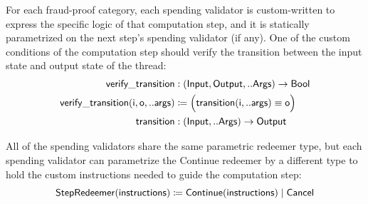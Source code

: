\documentclass[../midgard.tex]{subfiles}
\begin{document}
For each fraud-proof category, each spending validator is custom-written to express the specific logic of that computation step, and it is statically parametrized on the next step's spending validator (if any).
One of the custom conditions of the computation step should verify the transition between the input state and output state of the thread:
\begin{align*}
    \mathsf{verify\_transition} &: (\mathsf{Input}, \mathsf{Output}, ..\mathsf{Args}) -> \mathsf{Bool} \\
    \mathsf{verify\_transition(i, o, ..args)} &\coloneq
        \Bigl( \mathsf{transition(i, ..args) \equiv \mathsf{o}} \Bigr) \\
    \mathsf{transition} &: (\mathsf{Input}, ..\mathsf{Args}) -> \mathsf{Output}
\end{align*}

All of the spending validators share the same parametric redeemer type, but each spending validator can parametrize the Continue redeemer by a different type to hold the custom instructions needed to guide the computation step:
\begin{equation*}
    \mathsf{StepRedeemer} (\mathsf{instructions}) \coloneq
        \mathsf{Continue}(\mathsf{instructions}) \;|\;
        \mathsf{Cancel}
\end{equation*}
\end{document}

